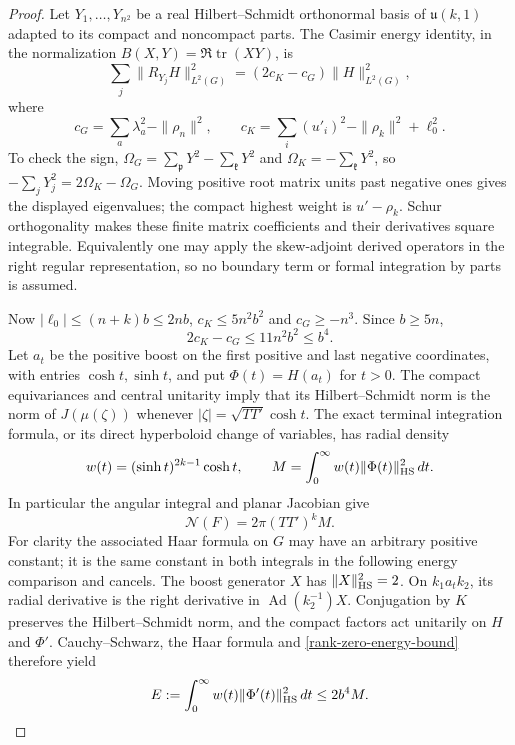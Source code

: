 \begin{proof}
Let $Y_1,\ldots,Y_{n^2}$ be a real Hilbert--Schmidt orthonormal
basis of $\mathfrak u(k,1)$ adapted to its compact and noncompact
parts.  The Casimir energy identity, in the normalization
$B(X,Y)=\Re\operatorname{tr}(XY)$, is
\begin{equation}\label{rank-zero-casimir-energy}
 \sum_j\|R_{Y_j}H\|_{L^2(G)}^2
             =(2c_K-c_G)\|H\|_{L^2(G)}^2,
\end{equation}
where
\[
 c_G=\sum_a\lambda_a^2-\|\rho_n\|^2,\qquad
 c_K=\sum_i(u'_i)^2-\|\rho_k\|^2+\ell_0^2.
\]
To check the sign, $\Omega_G=\sum_{\mathfrak p}Y^2-
\sum_{\mathfrak k}Y^2$ and $\Omega_K=-\sum_{\mathfrak k}Y^2$,
so $-\sum_jY_j^2=2\Omega_K-\Omega_G$.  Moving positive root
matrix units past negative ones gives the displayed eigenvalues;
the compact highest weight is $u'-\rho_k$.  Schur orthogonality
makes these finite matrix coefficients and their derivatives
square integrable.  Equivalently one may apply the skew-adjoint
derived operators in the right regular representation, so no
boundary term or formal integration by parts is assumed.

Now $|\ell_0|\le(n+k)b\le2nb$, $c_K\le5n^2b^2$ and
$c_G\ge-n^3$.  Since $b\ge5n$,
\begin{equation}\label{rank-zero-energy-bound}
                   2c_K-c_G\le11n^2b^2\le b^4.
\end{equation}
Let $a_t$ be the positive boost on the first positive and last
negative coordinates, with entries $\cosh t,\sinh t$, and put
$\Phi(t)=H(a_t)$ for $t>0$.  The compact equivariances and central
unitarity imply that its Hilbert--Schmidt norm is the norm of
$J(\mu(\zeta))$ whenever $|\zeta|=\sqrt{TT'}\cosh t$.
The exact terminal integration formula, or its direct
hyperboloid change of variables, has radial density
\[
 w(t)=(\sinh t)^{2k-1}\cosh t,
 \qquad M=\int_0^\infty w(t)\|\Phi(t)\|_{\rm HS}^2\,dt.
\]
In particular the angular integral and planar Jacobian give
\begin{equation}\label{rank-zero-radial-normalization}
                        \mathcal N(F)=2\pi(TT')^k M.
\end{equation}
For clarity the associated Haar formula on $G$ may have an
arbitrary positive constant; it is the same constant in both
integrals in the following energy comparison and cancels.
The boost generator $X$ has $\|X\|_{\rm HS}^2=2$.
On $k_1a_tk_2$, its radial derivative is the right derivative
in $\operatorname{Ad}(k_2^{-1})X$.  Conjugation by $K$ preserves
the Hilbert--Schmidt norm, and the compact factors act unitarily
on $H$ and $\Phi'$.  Cauchy--Schwarz, the Haar formula and
\eqref{rank-zero-energy-bound} therefore yield
\begin{equation}\label{rank-zero-radial-energy}
 E:=\int_0^\infty w(t)\|\Phi'(t)\|_{\rm HS}^2\,dt
                                  \le2b^4 M.
\end{equation}


\end{proof}

